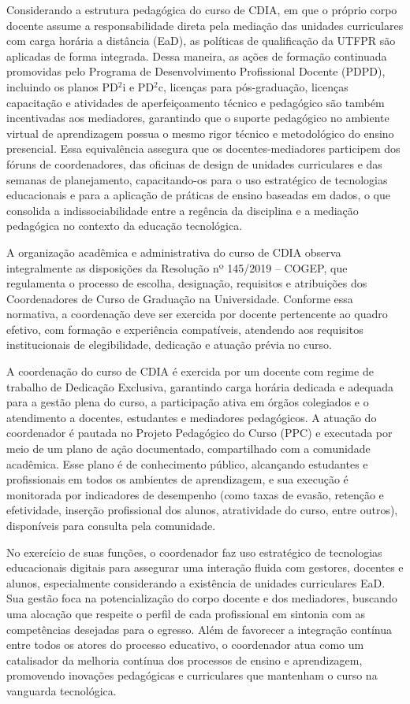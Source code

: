 Considerando a estrutura pedagógica do curso de CDIA, em que o próprio corpo docente assume a responsabilidade direta pela mediação das unidades curriculares com carga horária a distância (EaD), as políticas de qualificação da UTFPR são aplicadas de forma integrada. Dessa maneira, as ações de formação continuada promovidas pelo Programa de Desenvolvimento Profissional Docente (PDPD), incluindo os planos PD$^2$i e PD$^2$c, licenças para pós-graduação, licenças capacitação e atividades de aperfeiçoamento técnico e pedagógico são também incentivadas aos mediadores, garantindo que o suporte pedagógico no ambiente virtual de aprendizagem possua o mesmo rigor técnico e metodológico do ensino presencial. Essa equivalência assegura que os docentes-mediadores participem dos fóruns de coordenadores, das oficinas de design de unidades curriculares e das semanas de planejamento, capacitando-os para o uso estratégico de tecnologias educacionais e para a aplicação de práticas de ensino baseadas em dados, o que consolida a indissociabilidade entre a regência da disciplina e a mediação pedagógica no contexto da educação tecnológica.

A organização acadêmica e administrativa do curso de CDIA observa integralmente as disposições da Resolução nº 145/2019 – COGEP, que regulamenta o processo de escolha, designação, requisitos e atribuições dos Coordenadores de Curso de Graduação na Universidade. Conforme essa normativa, a coordenação deve ser exercida por docente pertencente ao quadro efetivo, com formação e experiência compatíveis, atendendo aos requisitos institucionais de elegibilidade, dedicação e atuação prévia no curso.

A coordenação do curso de CDIA é exercida por um docente com regime de trabalho de Dedicação Exclusiva, garantindo carga horária dedicada e adequada para a gestão plena do curso, a participação ativa em órgãos colegiados e o atendimento a docentes, estudantes e mediadores pedagógicos. A atuação do coordenador é pautada no Projeto Pedagógico do Curso (PPC) e executada por meio de um plano de ação documentado, compartilhado com a comunidade acadêmica. Esse plano é de conhecimento público, alcançando estudantes e profissionais em todos os ambientes de aprendizagem, e sua execução é monitorada por indicadores de desempenho (como taxas de evasão, retenção e efetividade, inserção profissional dos alunos, atratividade do curso, entre outros), disponíveis para consulta pela comunidade.

No exercício de suas funções, o coordenador faz uso estratégico de tecnologias educacionais digitais para assegurar uma interação fluida com gestores, docentes e alunos, especialmente considerando a existência de unidades curriculares EaD. Sua gestão foca na potencialização do corpo docente e dos mediadores, buscando uma alocação que respeite o perfil de cada profissional em sintonia com as competências desejadas para o egresso. Além de favorecer a integração contínua entre todos os atores do processo educativo, o coordenador atua como um catalisador da melhoria contínua dos processos de ensino e aprendizagem, promovendo inovações pedagógicas e curriculares que mantenham o curso na vanguarda tecnológica.

